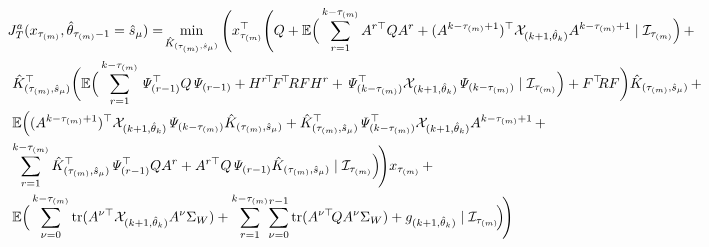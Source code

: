 \documentclass[journal,twoside,web]{ieeecolor}
\begin{document}

\begin{figure*}[ht]
\raggedright
\begin{align}\label{eq:cost-tau1}
\begin{aligned}
 & \text{\small $J_{T}^{a}(x_{\tau_{(m)}},\hat{\theta}_{\tau_{(m)}-1}=\hat{s}_{\mu}) = \!
    \min_{\hat{K}_{(\tau_{(m)},\hat{s}_{\mu})}} \Bigg( x_{\tau_{(m)}}^{\top} \Bigg(Q + \mathbb{E} \Big( \sum_{r=1}^{k-\tau_{(m)}} A^{r \top} Q A^{r}  + (A^{k-\tau_{(m)}+1})^{\top} \mathcal{X}_{(k+1,\hat{\theta}_k)} A^{k-\tau_{(m)}+1}\mid \mathcal{I}_{\tau_{(m)}} \Big) \,+ $}\\
    & ~ \text{\small $\hat{K}_{(\tau_{(m)},\hat{s}_{\mu})}^{\top} \bigg( \mathbb{E} \Big( \sum_{r=1}^{k-\tau_{(m)}} \mathit{\Psi}_{(r-1)}^{\top} Q \mathit{\Psi}_{(r-1)} + H^{r \!\top} \! F^{\!\top} \! R F H^{r} + \mathit{\Psi}_{(k-\tau_{(m)})}^{\top} \mathcal{X}_{(k+1,\hat{\theta}_k)} \mathit{\Psi}_{(k-\tau_{(m)})} \mid \mathcal{I}_{\tau_{(m)}} \Big) + F^{\top}\!\! R F \bigg) \hat{K}_{(\tau_{(m)},\hat{s}_{\mu})} \,+ $} \\
    & ~ \text{\small  $\mathbb{E} \Big( (A^{k-\tau_{(m)}+1})^{\top} \mathcal{X}_{(k+1,\hat{\theta}_k)} \mathit{\Psi}_{(k-\tau_{(m)})} \hat{K}_{(\tau_{(m)},\hat{s}_{\mu})} + \hat{K}_{(\tau_{(m)},\hat{s}_{\mu})}^{\top} \mathit{\Psi}_{(k-\tau_{(m)})} ^{\top} \mathcal{X}_{(k+1,\hat{\theta}_k)} A^{k-\tau_{(m)}+1} \,+$} \\
    & ~ \text{\small $ \sum_{r=1}^{k-\tau_{(m)}}\hat{K}_{(\tau_{(m)},\hat{s}_{\mu})}^{\top} \mathit{\Psi}_{(r-1)}^{\top} Q A^{r} +  A^{r \top} Q \mathit{\Psi}_{(r-1)} \hat{K}_{(\tau_{(m)},\hat{s}_{\mu})} 
    \mid \mathcal{I}_{\tau_{(m)}} \Big) \! \Bigg) x_{\tau_{(m)}} \,+$} \\
    & ~ \text{\small $\mathbb{E} \Big( \sum_{\nu=0}^{k-\tau_{(m)}} \mathop{\mathrm{tr}} (A^{\nu \top}  \mathcal{X}_{(k+1,\hat{\theta}_k)} A^{\nu} \Sigma_W) +\sum_{r=1}^{k-\tau_{(m)}} \!\sum_{\nu=0}^{r-1} \mathop{\mathrm{tr}} (A^{\nu \top} \! Q A^{\nu} \Sigma_W) + g_{(k+1,\hat{\theta}_k)} \mid \mathcal{I}_{\tau_{(m)}} \! \Big)\!\Bigg)$}
\end{aligned}
\end{align}

\end{figure*}
\end{document}
